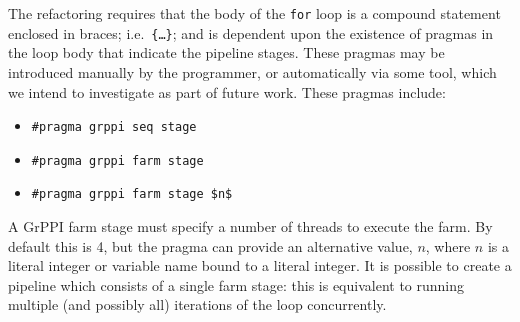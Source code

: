 \noindent
The refactoring requires that the body of the \texttt{for} loop is a compound statement enclosed in braces; i.e.\ \texttt{\{\dots\}}; and is dependent upon the existence of pragmas in the loop body that indicate the pipeline stages. These pragmas may be introduced manually by the programmer, or automatically via some tool, which we intend to investigate as part of future work.
These pragmas include:
% 
\begin{itemize}
\item
  \lstinline|#pragma grppi seq stage|
\item
  \lstinline|#pragma grppi farm stage|
\item
  \lstinline[mathescape]|#pragma grppi farm stage $n$|
\end{itemize}

\noindent
A GrPPI farm stage must specify a number of threads to execute the farm.
By default this is 4, but the pragma can provide an alternative value, $n$, where $n$ is a literal integer or variable name bound to a literal integer.
%
It is possible to create a pipeline which consists of a single
farm stage: this is equivalent to running multiple (and possibly all)
iterations of the loop concurrently.




